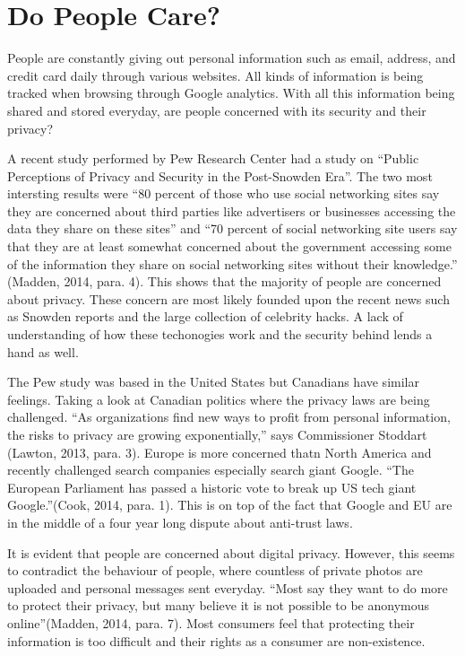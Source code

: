\documentclass[12pt]{article}
\begin{document}
\section{Do People Care?}\label{sec:demand}

People are constantly giving out personal information such as email, address, and credit card daily through various websites. All kinds of information is being tracked when browsing through Google analytics. With all this information being shared and stored everyday, are people concerned with its security and their privacy?

A recent study performed by Pew Research Center had a study on ``Public Perceptions of Privacy and Security in the Post-Snowden Era''. The two most intersting results were ``80 percent of those who use social networking sites say they are concerned about third parties like advertisers or businesses accessing the data they share on these sites'' and ``70 percent of social networking site users say that they are at least somewhat concerned about the government accessing some of the information they share on social networking sites without their knowledge.'' (Madden, 2014, para. 4). This shows that the majority of people are concerned about privacy. These concern are most likely founded upon the recent news such as Snowden reports and the large collection of celebrity hacks. A lack of understanding of how these techonogies work and the security behind lends a hand as well.

The Pew study was based in the United States but Canadians have similar feelings. Taking a look at Canadian politics where the privacy laws are being challenged. ``As organizations find new ways to profit from personal information, the risks to privacy are growing exponentially,'' says Commissioner Stoddart (Lawton, 2013, para. 3). Europe is more concerned thatn North America and recently challenged search companies especially search giant Google. ``The European Parliament has passed a historic vote to break up US tech giant Google.''(Cook, 2014, para. 1). This is on top of the fact that Google and EU are in the middle of a four year long dispute about anti-trust laws.

It is evident that people are concerned about digital privacy. However, this seems to contradict the behaviour of people, where countless of private photos are uploaded and personal messages sent everyday. ``Most say they want to do more to protect their privacy, but many believe it is not possible to be anonymous online''(Madden, 2014, para. 7). Most consumers feel that protecting their information is too difficult and their rights as a consumer are non-existence. 
\end{document}
